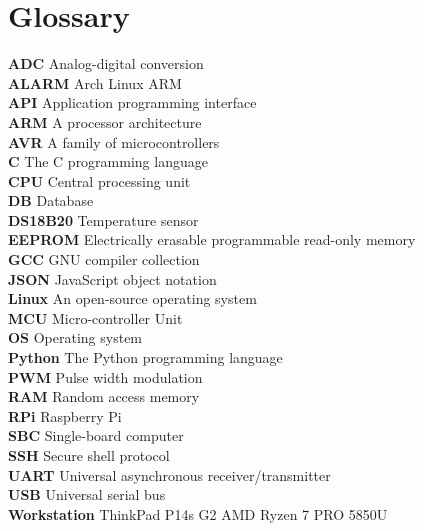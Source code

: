 \section*{Glossary}%
\label{sec:glossary}

\textbf{ADC} Analog-digital conversion \\
\textbf{ALARM} Arch Linux ARM \\
\textbf{API} Application programming interface \\
\textbf{ARM} A processor architecture \\
\textbf{AVR} A family of microcontrollers \\
\textbf{C} The C programming language \\
\textbf{CPU} Central processing unit \\
\textbf{DB} Database \\
\textbf{DS18B20} Temperature sensor \\
\textbf{EEPROM} Electrically erasable programmable read-only memory \\
\textbf{GCC} GNU compiler collection \\
\textbf{JSON} JavaScript object notation \\
\textbf{Linux} An open-source operating system \\
\textbf{MCU} Micro-controller Unit \\
\textbf{OS} Operating system \\
\textbf{Python} The Python programming language \\
\textbf{PWM} Pulse width modulation \\
\textbf{RAM} Random access memory \\
\textbf{RPi} Raspberry Pi \\
\textbf{SBC} Single-board computer \\
\textbf{SSH} Secure shell protocol\\
\textbf{UART} Universal asynchronous receiver/transmitter \\
\textbf{USB} Universal serial bus \\
\textbf{Workstation} ThinkPad P14s G2 AMD Ryzen 7 PRO 5850U \\
